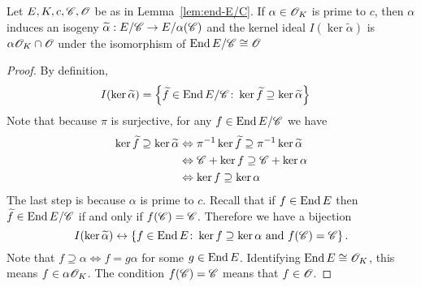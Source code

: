 \documentclass{amsart}
\begin{document}
\begin{lemma}\label{lem:c-idl-sbgp}
  Let $E,K,c,\mathscr{C},\mathscr{O}$ be as in Lemma~\ref{lem:end-E/C}. If $\alpha \in \mathscr{O}_K$ is prime to $c$, then $\alpha$ induces an isogeny $\widetilde{\alpha}: E/\mathscr{C} \to E/\alpha(\mathscr{C})$ and the kernel ideal $I(\ker\tilde{\alpha})$ is $\alpha\mathscr{O}_K \cap \mathscr{O}$ under the isomorphism of $\operatorname{End} E/\mathscr{C} \cong \mathscr{O}$
\end{lemma}
\begin{proof}
  By definition,
  \begin{align*}
    I(\ker\widetilde{\alpha})
    &=
    \left\{\widetilde{f} \in \operatorname{End} E/\mathscr{C} \colon \ker\widetilde{f} \supseteq \ker\widetilde{\alpha} \right\}
  \end{align*}
  Note that because $\pi$ is surjective, for any $f \in \operatorname{End} E/\mathscr{C}$ we have
  \begin{align*}
    \ker\widetilde{f} \supseteq \ker\widetilde{\alpha}
    &\Leftrightarrow
    \pi^{-1}\ker\widetilde{f} \supseteq \pi^{-1}\ker\widetilde{\alpha}
    \\
    &\Leftrightarrow
    \mathscr{C} + \ker f \supseteq \mathscr{C} + \ker\alpha
    \\
    &\Leftrightarrow
    \ker f \supseteq \ker\alpha
  \end{align*}
  The last step is because $\alpha$ is prime to $c$.
  Recall that if $f \in \operatorname{End} E$ then $\widetilde{f} \in \operatorname{End} E/\mathscr{C}$ if and only if $f(\mathscr{C}) = \mathscr{C}$. Therefore we have a bijection
  \[
    I(\ker\widetilde{\alpha})
    \leftrightarrow
    \left\{ f \in \operatorname{End} E \colon \ker f \supseteq \ker \alpha \text{ and } f(\mathscr{C}) = \mathscr{C} \right\}.
  \]
  Note that $f \supseteq \alpha \Leftrightarrow f = g\alpha$ for some $g \in \operatorname{End} E$. Identifying $\operatorname{End} E \cong \mathscr{O}_K$, this means $f \in \alpha\mathscr{O}_K$. The condition $f(\mathscr{C}) = \mathscr{C}$ means that $f \in \mathscr{O}$.
\end{proof}
\end{document}
